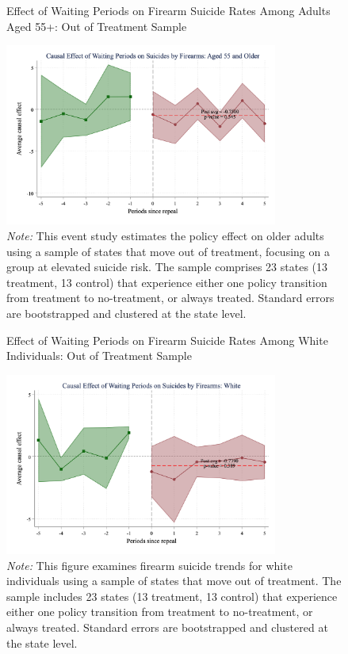 \begin{figure}[htbp]
    \centering
    \caption{Effect of Waiting Periods on Firearm Suicide Rates Among Adults Aged 55+: Out of Treatment Sample}
    \label{fig:firearm_suicide_DID_older-out}
    \includegraphics[width=0.8\textwidth]{figures/1010-csid-age_55p-outsample-fire.png}
    \begin{minipage}{\linewidth}
    \caption*{\footnotesize{
      \noindent\textit{Note:} This event study estimates the policy effect on older adults using a sample of states that move out of treatment, focusing on a group at elevated suicide risk. The sample comprises 23 states (13 treatment, 13 control) that experience either one policy transition from treatment to no-treatment, or always treated. Standard errors are bootstrapped and clustered at the state level. 
    }}
  \end{minipage}
\end{figure}

\pagebreak
\clearpage

\begin{figure}[htbp]
    \centering
    \caption{Effect of Waiting Periods on Firearm Suicide Rates Among White Individuals: Out of Treatment Sample}
    \label{fig:firearm_suicide_DID_white-out}
    \includegraphics[width=0.8\textwidth]{figures/1011-csid-white-outsample-fire.png}
    \begin{minipage}{\linewidth}
    \caption*{\footnotesize{
      \noindent\textit{Note:} This figure examines firearm suicide trends for white individuals using a sample of states that move out of treatment. The sample includes 23 states (13 treatment, 13 control) that experience either one policy transition from treatment to no-treatment, or always treated. Standard errors are bootstrapped and clustered at the state level. 
    }}
  \end{minipage}
\end{figure}

